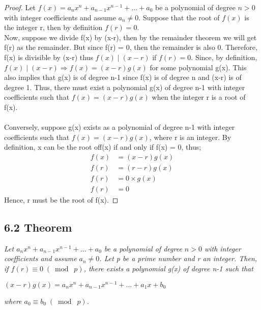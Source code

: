 \documentclass{article}
\begin{document}
\begin{proof}
Let $f(x) = a_nx^n + a_{n-1}x^{n-1} + ... + a_0$ be a polynomial of degree $n > 0$ with integer coefficients and assume $a_n \neq 0$. Suppose that the root of $f(x)$ is the integer r, then by definition $f(r) = 0$.\\
Now, suppose we divide f(x) by (x-r), then by the remainder theorem we will get f(r) as the remainder. But since f(r) = 0, then the remainder is also 0. Therefore, f(x) is divisible by (x-r) thus $f(x) \mid (x-r)$ if $f(r) = 0$. Since, by definition, $f(x) \mid (x-r) \Longrightarrow f(x) = (x-r)g(x)$ for some polynomial g(x). This also implies that g(x) is of degree n-1 since f(x) is of degree n and (x-r) is of degree 1. Thus, there must exist a polynomial g(x) of degree n-1 with integer coefficients such that $f(x) = (x-r)g(x)$ when the integer r is a root of f(x).\\\\
Conversely, suppose g(x) exists as a polynomial of degree n-1 with integer coefficients such that $f(x) = (x-r)g(x)$, where r is an integer. By definition, x can be the root off(x) if and only if f(x) = 0, thus;
\begin{align*}
    && f(x) &= (x-r)g(x) &&\\
    && f(r) &= (r-r)g(x) &&\\
    && f(r) &= 0 \times g(x) &&\\
    && f(r) &= 0 &&
\end{align*}
Hence, r must be the root of f(x).
\end{proof}

\subsection*{6.2 Theorem} 
\quad \textit{Let $a_nx^n + a_{n-1}x^{n-1} + ... + a_0$ be a polynomial of degree $n > 0$ with integer coefficients and assume $a_n \neq 0$. Let p be a prime number and r an integer. Then, if $f(r) \equiv 0 \;(\bmod\; p)$, there exists a polynomial g(x) of degree n-1 such that}
\begin{center}
    $(x-r)g(x) = a_nx^n + a_{n-1}x^{n-1} + ... + a_1x + b_0$
\end{center}
\textit{where $a_0 \equiv b_0 \;(\bmod\; p)$.}
\end{document}
